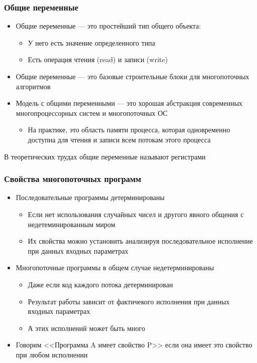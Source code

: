 \documentclass[10pt,a4paper,oneside,titlepage]{article}
\begin{document}
\subsubsection{Общие переменные}
\begin{itemize}
	\item Общие переменные --- это простейший тип общего объекта:
	\begin{itemize}
		\item У него есть значение определенного типа
		\item Есть операция чтения (read) и записи (write)
	\end{itemize}
    \item Общие переменные --- это базовые строительные блоки для многопоточных алгоритмов
    \item Модель с общими переменными --- это хорошая абстракция современных многопроцессорных систем и многопоточных ОС
    \begin{itemize}
    	\item На практике, это область памяти процесса, которая одновременно доступна для чтения и записи всем потокам этого процесса
    \end{itemize}
\end{itemize}

В теоретических трудах общие переменные называют регистрами

\subsubsection{Свойства многопоточных программ}
\begin{itemize}
	\item Последовательные программы детерминированы
	\begin{itemize}
		\item Если нет использования случайных чисел и другого явного общения с недетеминированным миром
		\item Их свойства можно установить анализируя последовательное исполнение при данных входных параметрах
	\end{itemize}
    \item Многопоточные программы в общем случае недетерминированы
    \begin{itemize}
    	\item Даже если код каждого потока детерминирован
    	\item Результат работы зависит от фактичекого исполнения при данных входных параметрах
    	\item А этих исполнений может быть много
    \end{itemize}
    \item Говорим <<Программа A имеет свойство P>> если она имеет это свойство при любом исполнении
\end{itemize}
\end{document}
